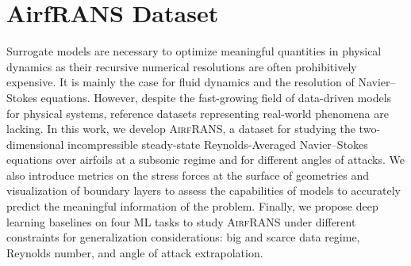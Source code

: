 \chapter{AirfRANS Dataset} %

Surrogate models are necessary to optimize meaningful quantities in physical dynamics as their recursive numerical resolutions are often prohibitively expensive. It is mainly the case for fluid dynamics and the resolution of Navier–Stokes equations. However, despite the fast-growing field of data-driven models for physical systems, reference datasets representing real-world phenomena are lacking. In this work, we develop \textsc{AirfRANS}, a dataset for studying the two-dimensional incompressible steady-state Reynolds-Averaged Navier–Stokes equations over airfoils at a subsonic regime and for different angles of attacks. We also introduce metrics on the stress forces at the surface of geometries and visualization of boundary layers to assess the capabilities of models to accurately predict the meaningful information of the problem. Finally, we propose deep learning baselines on four \acrlong{ML} tasks to study \textsc{AirfRANS} under different constraints for generalization considerations: big and scarce data regime, Reynolds number, and angle of attack extrapolation.

